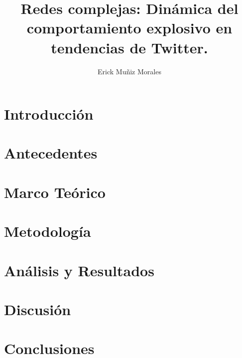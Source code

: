 \documentclass[letterpaper,spanish,12pt]{report}
\author{Erick Muñiz Morales}
\title{Redes complejas: Dinámica del comportamiento explosivo en tendencias de Twitter. }
\begin{document}
\maketitle %

\tableofcontents %


\chapter*{Introducción}



\chapter{Antecedentes}


\chapter{Marco Teórico}


\chapter{Metodología}



\chapter{Análisis y Resultados}


\chapter{Discusión}


\chapter*{Conclusiones}


\end{document}
